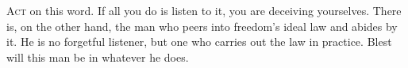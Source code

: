 
\lettrine{A}{ct} on this word. If all you do is listen to it, you are deceiving yourselves. There is, on the other hand, the man who peers into freedom’s ideal law and abides by it. He is no forgetful listener, but one who carries out the law in practice. Blest will this man be in whatever he does.